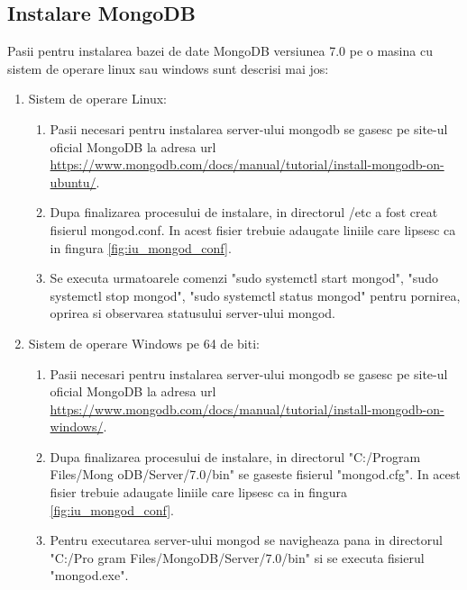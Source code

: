 \subsection{Instalare MongoDB}\label{subsec:iu_instalare_mongoDB}
Pasii pentru instalarea bazei de date MongoDB versiunea 7.0 pe o masina cu sistem de operare linux sau windows sunt descrisi mai jos:
\begin{enumerate}
    \item Sistem de operare Linux:
    \begin{enumerate}
        \item Pasii necesari pentru instalarea server-ului mongodb se gasesc pe site-ul oficial MongoDB la adresa url 
        \url{https://www.mongodb.com/docs/manual/tutorial/install-mongodb-on-ubuntu/}.
        \item Dupa finalizarea procesului de instalare, in directorul /etc a fost creat fisierul mongod.conf. In acest fisier trebuie adaugate liniile care lipsesc 
        ca in fingura \ref{fig:iu_mongod_conf}.
        \item Se executa urmatoarele comenzi "sudo systemctl start mongod", "sudo systemctl stop mongod", "sudo systemctl 
        status mongod" pentru pornirea, oprirea si observarea statusului server-ului mongod.
    \end{enumerate}
    \item Sistem de operare Windows pe 64 de biti:
    \begin{enumerate}
        \item Pasii necesari pentru instalarea server-ului mongodb se gasesc pe site-ul oficial MongoDB la adresa url 
        \url{https://www.mongodb.com/docs/manual/tutorial/install-mongodb-on-windows/}.
        \item Dupa finalizarea procesului de instalare, in directorul "C:/Program Files/Mong oDB/Server/7.0/bin" se gaseste fisierul "mongod.cfg". In acest fisier 
        trebuie adaugate liniile care lipsesc ca in fingura \ref{fig:iu_mongod_conf}.
        \item Pentru executarea server-ului mongod se navigheaza pana in directorul "C:/Pro gram Files/MongoDB/Server/7.0/bin" si se executa fisierul "mongod.exe".
    \end{enumerate}
\end{enumerate}

